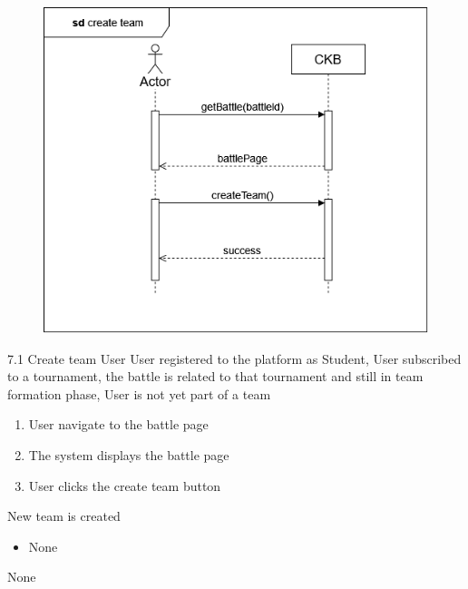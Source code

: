 \usecase
{
    \begin{figure}[H]
        \centering
        \includegraphics[width=\textwidth]{src/sd_diagrams/createteam.png}
    \end{figure}
}
{7.1}
{Create team} %
{User} %
{User registered to the platform as Student, User subscribed to a tournament, the battle is related to that tournament and still in team formation phase, User is not yet part of a team} %
{ %
    \begin{enumerate}
        \item User navigate to the battle page
        \item The system displays the battle page
        \item User clicks the create team button
    \end{enumerate}
}
{New team is created} %
{ %
    \begin{itemize}
        \item None
    \end{itemize}
}
{ %
None
}

